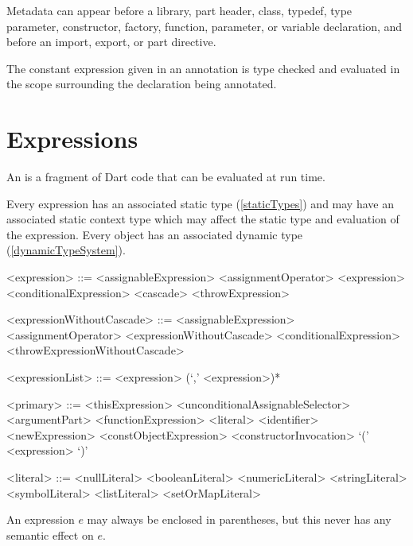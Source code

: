 \documentclass[makeidx]{article}
\begin{document}
{\LMHash{}%
Metadata can appear before a library, part header, class,
typedef, type parameter, constructor, factory, function,
parameter, or variable declaration,
and before an import, export, or part directive.

\LMHash{}%
The constant expression given in an annotation is type checked and evaluated
in the scope surrounding the declaration being annotated.


\section{Expressions}

\LMHash{}%
An  is a fragment of Dart code
that can be evaluated at run time.

\LMHash{}%
Every expression has an associated static type (\ref{staticTypes}) and
may have an associated static context type
which may affect the static type and evaluation of the expression.
Every object has an associated dynamic type (\ref{dynamicTypeSystem}).

\begin{grammar}
<expression> ::= <assignableExpression> <assignmentOperator> <expression>
  \alt <conditionalExpression>
  \alt <cascade>
  \alt <throwExpression>

<expressionWithoutCascade> ::= \gnewline{}
  <assignableExpression> <assignmentOperator> <expressionWithoutCascade>
  \alt <conditionalExpression>
  \alt <throwExpressionWithoutCascade>

<expressionList> ::= <expression> (`,' <expression>)*

<primary> ::= <thisExpression>
  \alt \SUPER{} <unconditionalAssignableSelector>
  \alt \SUPER{} <argumentPart>
  \alt <functionExpression>
  \alt <literal>
  \alt <identifier>
  \alt <newExpression>
  \alt <constObjectExpression>
  \alt <constructorInvocation>
  \alt `(' <expression> `)'

<literal> ::= <nullLiteral>
  \alt <booleanLiteral>
  \alt <numericLiteral>
  \alt <stringLiteral>
  \alt <symbolLiteral>
  \alt <listLiteral>
  \alt <setOrMapLiteral>
\end{grammar}

\LMHash{}%
An expression $e$ may always be enclosed in parentheses,
but this never has any semantic effect on $e$.

}
\end{document}
